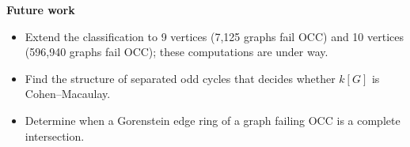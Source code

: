 \documentclass{article}
\newlength{\colwidth}
\newlength{\colheight}
\newcommand{\sect}[1]{%
  {\sffamily\bfseries\fontsize{50}{58}\selectfont\color{navy}#1\par}%
  \vspace{4pt}{\color{navy}\hrule height 3pt}\vspace{14pt}}
\begin{document}
\begin{minipage}[t][\colheight][s]{\colwidth}
\vfill
\sect{Future work}
\begin{itemize}
\item Extend the classification to 9 vertices (7,125 graphs fail OCC) and 10 vertices
  (596,940 graphs fail OCC); these computations are under way.
\item Find the structure of separated odd cycles that decides whether $k[G]$ is Cohen--Macaulay.
\item Determine when a Gorenstein edge ring of a graph failing OCC is a complete intersection.
\end{itemize}
\end{minipage}

\vfill
\noindent\usebox{\footerbox}
\end{document}
